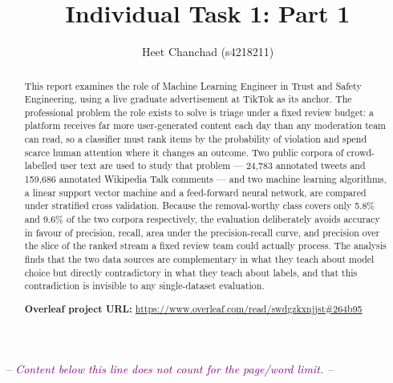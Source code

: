 \documentclass[manuscript,screen,review,nonacm]{acmart}
\begin{document}
\title{Individual Task 1: Part 1}

\author{Heet Chanchad (s4218211)}

\renewcommand{\shortauthors}{Chanchad}

\begin{abstract}
  This report examines the role of Machine Learning Engineer in Trust and Safety
  Engineering, using a live graduate advertisement at TikTok as its anchor. The
  professional problem the role exists to solve is triage under a fixed review budget: a
  platform receives far more user-generated content each day than any moderation team can
  read, so a classifier must rank items by the probability of violation and spend scarce
  human attention where it changes an outcome. Two public corpora of crowd-labelled user
  text are used to study that problem --- 24,783 annotated tweets and 159,686 annotated
  Wikipedia Talk comments --- and two machine learning algorithms, a linear support vector
  machine and a feed-forward neural network, are compared under stratified cross
  validation. Because the removal-worthy class covers only 5.8\% and 9.6\% of the two
  corpora respectively, the evaluation deliberately avoids accuracy in favour of
  precision, recall, area under the precision-recall curve, and precision over the slice
  of the ranked stream a fixed review team could actually process. The analysis finds that
  the two data sources are complementary in what they teach about model choice but
  directly contradictory in what they teach about labels, and that this contradiction is
  invisible to any single-dataset evaluation.

  \textbf{Overleaf project URL:} \url{https://www.overleaf.com/read/swdgzkxnjjst\#264b95}
\end{abstract}

\maketitle





\clearpage

\begin{center}
    \noindent \textcolor{purple}{\emph{-- Content below this line does not count for the page/word limit. --}}
\end{center}
\end{document}
